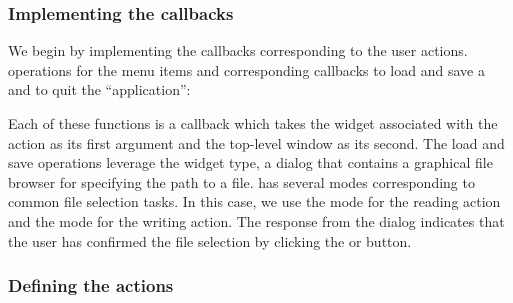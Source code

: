 \documentclass[article,shortnames]{jss}
\begin{document}
\subsubsection{Implementing the callbacks}

We begin by implementing the callbacks corresponding to the user
actions. operations for the menu items and corresponding
callbacks to load and save a  and to quit the
``application'':
Each of these functions is a callback which takes the widget
associated with the action as its first argument and the
top-level window as its second. The load and save operations leverage
the  widget type, a dialog that contains a
graphical file browser for specifying the path to a
file.  has several modes corresponding to
common file selection tasks. In this case, we use the  mode
for the reading action and the  mode for the writing
action. The  response from the dialog indicates that the
user has confirmed the file selection by clicking the  or
 button.

\subsubsection{Defining the actions}
\end{document}
